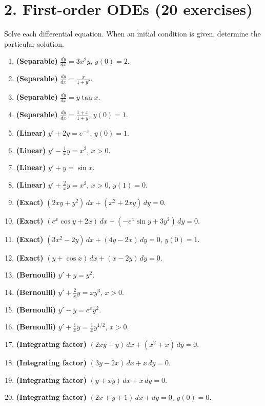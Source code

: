 \documentclass[11pt,a4paper]{article}
\begin{document}
\section*{2. First-order ODEs (20 exercises)}
Solve each differential equation. When an initial condition is given, determine the particular solution.

\begin{enumerate}
    \item \textbf{(Separable)} $\displaystyle \frac{dy}{dx}=3x^2y$, \quad $y(0)=2$.
    \item \textbf{(Separable)} $\displaystyle \frac{dy}{dx}=\frac{x}{1+y^2}$.
    \item \textbf{(Separable)} $\displaystyle \frac{dy}{dx}=y\tan x$.
    \item \textbf{(Separable)} $\displaystyle \frac{dy}{dx}=\frac{1+x}{1+y}$, \quad $y(0)=1$.
    \item \textbf{(Linear)} $\displaystyle y'+2y=e^{-x}$, \quad $y(0)=1$.
    \item \textbf{(Linear)} $\displaystyle y'-\frac{1}{x}y=x^2$, \quad $x>0$.
    \item \textbf{(Linear)} $\displaystyle y'+y=\sin x$.
    \item \textbf{(Linear)} $\displaystyle y'+\frac{2}{x}y=x^2$, \quad $x>0$, \quad $y(1)=0$.
    \item \textbf{(Exact)} $(2xy+y^2)\,dx+(x^2+2xy)\,dy=0$.
    \item \textbf{(Exact)} $(e^x\cos y+2x)\,dx+(-e^x\sin y+3y^2)\,dy=0$.
    \item \textbf{(Exact)} $(3x^2-2y)\,dx+(4y-2x)\,dy=0$, \quad $y(0)=1$.
    \item \textbf{(Exact)} $(y+\cos x)\,dx+(x-2y)\,dy=0$.
    \item \textbf{(Bernoulli)} $\displaystyle y'+y=y^2$.
    \item \textbf{(Bernoulli)} $\displaystyle y'+\frac{2}{x}y=x y^3$, \quad $x>0$.
    \item \textbf{(Bernoulli)} $\displaystyle y'-y=e^x y^2$.
    \item \textbf{(Bernoulli)} $\displaystyle y'+\frac{1}{x}y=\frac{1}{x}y^{1/2}$, \quad $x>0$.
    \item \textbf{(Integrating factor)} $(2xy+y)\,dx+(x^2+x)\,dy=0$.
    \item \textbf{(Integrating factor)} $(3y-2x)\,dx+x\,dy=0$.
    \item \textbf{(Integrating factor)} $(y+xy)\,dx+x\,dy=0$.
    \item \textbf{(Integrating factor)} $(2x+y+1)\,dx+dy=0$, \quad $y(0)=0$.
\end{enumerate}
\end{document}
